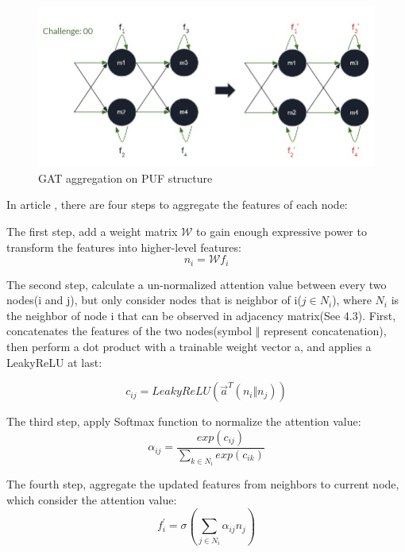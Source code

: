 \begin{figure}[htp]
    \centering
    \includegraphics[width=16cm]{figures/figure12.jpg}
    \caption{GAT aggregation on PUF structure}
    \label{fig:figure12}
    \end{figure}

In article \cite{Reference10}, there are four steps to aggregate the features of each node:

The first step, add a weight matrix $\mathcal{W}$ to gain enough expressive power to transform the features into higher-level features:
\begin{equation}
    n_i = \mathcal{W}f_i
\end{equation}

The second step, calculate a un-normalized attention value between every two nodes(i and j), but only consider nodes that is neighbor of i($j \in N_i$), where $N_i$ is the neighbor of node i that can be observed in 
adjacency matrix(See 4.3). First, concatenates the features of the two nodes(symbol $\Vert$ represent concatenation), then perform a dot product with a trainable weight vector a, and applies a LeakyReLU at last:

\begin{equation}
    c_{ij} = LeakyReLU(\overrightarrow{a}^T(n_i \Vert n_j))
\end{equation}

The third step, apply Softmax function to normalize the attention value:
\begin{equation}
    \alpha_{ij} = \frac{exp(c_{ij})}{\sum_{k \in N_i}  exp(c_{ik})} 
\end{equation}

The fourth step, aggregate the updated features from neighbors to current node, which consider the attention value:
\begin{equation}
    f_i^{'} = \sigma (\sum_{j \in N_i} \alpha_{ij}n_j)
\end{equation}

